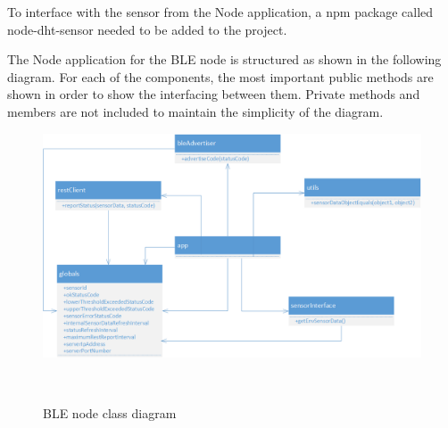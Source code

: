 To interface with the sensor from the Node application, a npm package called node-dht-sensor needed to be added to the project.

The Node application for the BLE node is structured as shown in the following diagram. For each of the components, the most important public methods are shown in order to show the interfacing between them. Private methods and members are not included to maintain the simplicity of the diagram.


\begin{figure}[H]
\centering
\includegraphics[scale=0.6]{gfx/bleNode_architecture}  
\caption{BLE node class diagram}~\label{fig:bleNode_architecture}
\end{figure}


